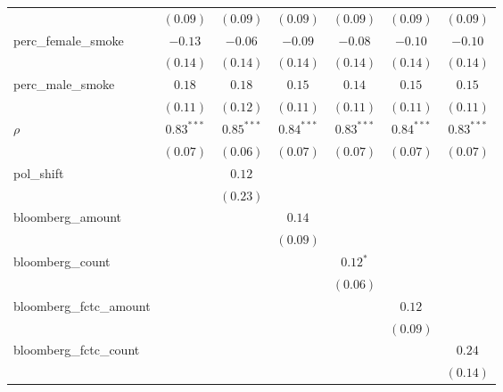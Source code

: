 \begin{table}[!h]
\begin{center}
\begin{tabular}{l c c c c c c }
                        & $(0.09)$     & $(0.09)$     & $(0.09)$     & $(0.09)$     & $(0.09)$     & $(0.09)$     \\
perc\_female\_smoke     & $-0.13$      & $-0.06$      & $-0.09$      & $-0.08$      & $-0.10$      & $-0.10$      \\
                        & $(0.14)$     & $(0.14)$     & $(0.14)$     & $(0.14)$     & $(0.14)$     & $(0.14)$     \\
perc\_male\_smoke       & $0.18$       & $0.18$       & $0.15$       & $0.14$       & $0.15$       & $0.15$       \\
                        & $(0.11)$     & $(0.12)$     & $(0.11)$     & $(0.11)$     & $(0.11)$     & $(0.11)$     \\
$\rho$                  & $0.83^{***}$ & $0.85^{***}$ & $0.84^{***}$ & $0.83^{***}$ & $0.84^{***}$ & $0.83^{***}$ \\
                        & $(0.07)$     & $(0.06)$     & $(0.07)$     & $(0.07)$     & $(0.07)$     & $(0.07)$     \\
pol\_shift              &              & $0.12$       &              &              &              &              \\
                        &              & $(0.23)$     &              &              &              &              \\
bloomberg\_amount       &              &              & $0.14$       &              &              &              \\
                        &              &              & $(0.09)$     &              &              &              \\
bloomberg\_count        &              &              &              & $0.12^{*}$   &              &              \\
                        &              &              &              & $(0.06)$     &              &              \\
bloomberg\_fctc\_amount &              &              &              &              & $0.12$       &              \\
                        &              &              &              &              & $(0.09)$     &              \\
bloomberg\_fctc\_count  &              &              &              &              &              & $0.24$       \\
                        &              &              &              &              &              & $(0.14)$     \\

\end{tabular}
\end{center}
\end{table}
